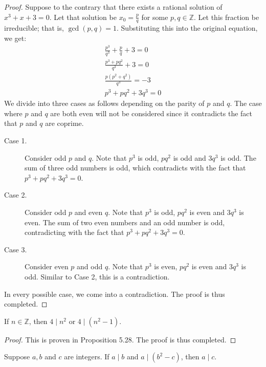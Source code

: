 \documentclass{exam}
\begin{document}
\begin{proof}
    Suppose to the contrary that there exists a rational solution of $x^3 + x +3 = 0$. Let that solution be $x_0=\frac{p}{q}$ for some $p,q\in\mathbb Z$. Let this fraction be irreducible; that is, $\gcd(p, q) = 1$. Substituting this into the original equation, we get:
    \begin{align*}
        \frac{p^3}{q^3} + \frac p q + 3 = 0\\
        \frac{p^3+pq^2}{q^3}+3=0\\
        \frac{p(p^2+q^2)}{q^3}=-3\\
        p^3+pq^2+3q^3=0
    \end{align*}
    We divide into three cases as follows depending on the parity of $p$ and $q$. The case where $p$ and $q$ are both even will not be considered since it contradicts the fact that $p$ and $q$ are coprime.
    \begin{description}
        \item[Case 1. ] Consider odd $p$ and $q$. Note that $p^3$ is odd, $pq^2$ is odd and $3q^3$ is odd. The sum of three odd numbers is odd, which contradicts with the fact that $p^3 + pq^2 + 3q^3 = 0$.
        \item[Case 2. ] Consider odd $p$ and even $q$. Note that $p^3$ is odd, $pq^2$ is even and $3q^3$ is even. The sum of two even numbers and an odd number is odd, contradicting with the fact that $p^3 + pq^2 + 3q^3 = 0$.
        \item[Case 3. ] Consider even $p$ and odd $q$. Note that $p^3$ is even, $pq^2$ is even and $3q^3$ is odd. Similar to Case 2, this is a contradiction.
    \end{description}
    In every possible case, we come into a contradiction. The proof is thus completed.
\end{proof}

\begin{proposition}{7.22}
    If $n\in\mathbb Z$, then $4\mid n^2$ or $4\mid(n^2-1)$.
\end{proposition}

\begin{proof}
    This is proven in Proposition 5.28. The proof is thus completed.
\end{proof}

\begin{proposition}{7.23}
    Suppose $a, b$ and $c$ are integers. If $a\mid b$ and $a\mid(b^2-c)$, then $a\mid c$.
\end{proposition}
\end{document}
